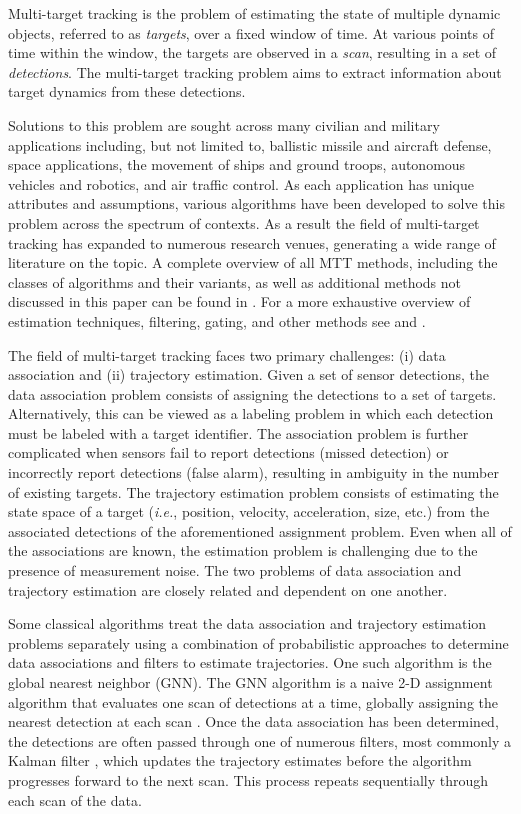 Multi-target tracking is the problem of estimating the state of multiple dynamic objects, referred to as \textit{targets}, over a fixed window of time. At various points of time within the window, the targets are observed in a \textit{scan}, resulting in a set of \textit{detections}. The multi-target tracking problem aims to extract information about target dynamics from these detections. 

Solutions to this problem are sought across many civilian and military applications including, but not limited to, ballistic missile and aircraft defense, space applications, the movement of ships and ground troops, autonomous vehicles and robotics, and air traffic control. As each application has unique attributes and assumptions, various algorithms have been developed to solve this problem across the spectrum of contexts. As a result the field of multi-target tracking has expanded to numerous research venues, generating a wide range of literature on the topic. A complete overview of all MTT methods, including the classes of algorithms and their variants, as well as additional methods not discussed in this paper can be found in \cite{MTT-Taxonomy}. For a more exhaustive overview of estimation techniques, filtering, gating, and other methods see \cite{Bar-Shalom_MTT} and \cite{Bar-Shalom_Estimation}.

The field of multi-target tracking faces two primary challenges: (i) data association and (ii) trajectory estimation.  Given a set of sensor detections, the data association problem consists of assigning the detections to a set of targets. Alternatively, this can be viewed as a labeling problem in which each detection must be labeled with a target identifier. The association problem is further complicated when sensors fail to report detections (missed detection) or incorrectly report detections (false alarm), resulting in ambiguity in the number of existing targets. The trajectory estimation problem consists of estimating the state space of a target (\textit{i.e.}, position, velocity, acceleration, size, etc.) from the associated detections of the aforementioned assignment problem. Even when all of the associations are known, the estimation problem is challenging due to the presence of measurement noise. The two problems of data association and trajectory estimation are closely related and dependent on one another. 

Some classical algorithms treat the data association and trajectory estimation problems separately using a combination of probabilistic approaches to determine data associations and filters to estimate trajectories. One such algorithm is the global nearest neighbor (GNN). The GNN algorithm is a naive 2-D assignment algorithm that evaluates one scan of detections at a time, globally assigning the nearest detection at each scan \cite{GNN}. Once the data association has been determined, the detections are often passed through one of numerous filters, most commonly a Kalman filter \cite{Kalman}, which updates the trajectory estimates before the algorithm progresses forward to the next scan. This process repeats sequentially through each scan of the data.

